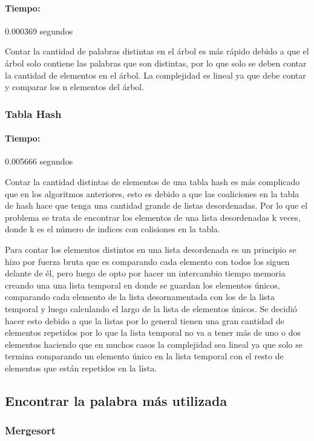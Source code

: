 \documentclass[12pt,letterpaper]{scrartcl}
\begin{document}
\paragraph{Tiempo:} 0.000369 segundos

Contar la cantidad de palabras distintas en el árbol es más rápido debido a que el árbol solo contiene las palabras que son distintas, por lo que solo se deben contar la cantidad de elementos en el árbol. La complejidad es lineal ya que debe contar y comparar los n elementos del árbol.

\subsubsection{Tabla Hash}

\paragraph{Tiempo:} 0.005666 segundos

Contar la cantidad distintas de elementos de una tabla hash es más complicado que en los algoritmos anteriores, esto es debido a que las coaliciones en la tabla de hash hace que tenga una cantidad grande de listas desordenadas. Por lo que el problema se trata de encontrar los elementos de una lista desordenadas k veces, donde k es el número de indices con colisiones en la tabla.

Para contar los elementos distintos en una lista desordenada es un principio se hizo por fuerza bruta que es comparando cada elemento con todos los siguen delante de él, pero luego de opto por hacer un intercambio tiempo memoria creando una una lista temporal en donde se guardan los elementos únicos, comparando cada elemento de la lista desornamentada con los de la lista temporal y luego calculando el largo de la lista de elementos únicos. Se decidió hacer esto debido a que la listas por lo general tienen una gran cantidad de elementos repetidos por lo que la lista temporal no va a tener más de uno o dos elementos haciendo que en muchos casos la complejidad sea lineal ya que solo se termina comparando un elemento único en la lista temporal con el resto de elementos que están repetidos en la lista.

\subsection{Encontrar la palabra más utilizada}

\subsubsection{Mergesort}
\end{document}
